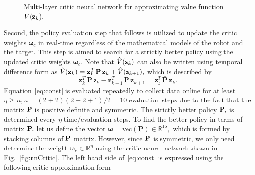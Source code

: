 \documentclass[conference]{IEEEtran}
\begin{document}
\begin{figure}
{\begin{adjustbox}{max width = 0.45\textwidth}
        \end{adjustbox}      
    }
    \caption{Multi-layer critic neural network for approximating value function $V({\bf z}_k).$}
    \label{fig:nnCritic}
      \end{figure}
 Second, the policy evaluation step that follows is utilized to update the critic weights $\bm{\omega}_c$ in real-time regardless of the mathematical models of the robot and the target. This step is aimed to search for a strictly better policy using the updated critic weights $\bm{\omega}_c.$ Note that $\hat V({\bf z}_k)$ can also be written using temporal difference form as $\hat V({\bf z}_k) = \mathbf{z}_k^T\, \bar{\mathbf{P}}\, \mathbf{z}_k + \hat V({\bf z}_{k+1}),$ which is described by 
 \begin{equation}
 \label{eq:const}
 \mathbf{z}_k^T\, \mathbf{P}\, \mathbf{z}_k - \mathbf{z}_{k+1}^T\, \mathbf{P}\, \mathbf{z}_{k+1} = \mathbf{z}_k^T\, \bar{\mathbf{P}}\, \mathbf{z}_k. 
 \end{equation}
 Equation~\eqref{eq:const} is evaluated repeatedly to collect data online for at least $\eta\ge \bar n, \bar n= (2+2)(2+2+1)/2 = 10$ evaluation steps due to the fact that the matrix ${\bf P}$ is positive definite and symmetric. The strictly better policy ${\bf P},$ is determined every $\eta$ time/evaluation steps. To find the better policy in terms of matrix ${\bf P},$ let us define the vector $\boldsymbol{\omega}=\mathrm{vec}(\mathbf{P})\in\mathbb{R}^{16},$ which is formed by stacking columns of ${\bf P}$ matrix.  However, since ${\bf P}$ is symmetric, we only need determine the weight $\bm{\omega}_c\in\mathbb{R}^{\bar n}$ using the critic neural network shown in Fig.~\eqref{fig:nnCritic}. The left hand side of~\eqref{eq:const} is expressed using the following critic approximation form %
\end{document}

